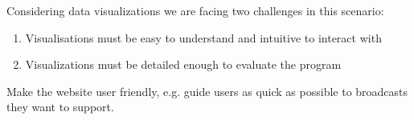 \documentclass{article}
\begin{document}
Considering data visualizations we are facing two challenges in this scenario:
\begin{enumerate}
\item
Visualisations must be easy to understand and intuitive to interact with
\item
Visualizations must be detailed enough to evaluate the program
\end{enumerate}

Make the website user friendly, e.g. guide users as quick as possible to broadcasts they want to support.





\clearpage
\printbibliography
\end{document}
